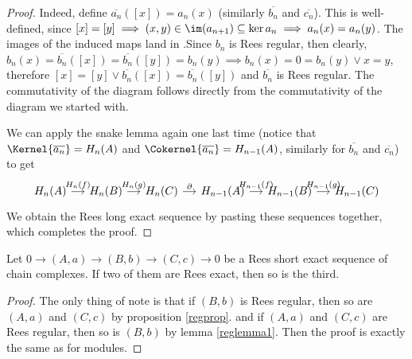 \begin{proof}[Proof]
    Indeed, define $\overline{a_n}([x]) = a_n(x)$ (similarly $\overline{b_n}$ and $\overline{c_n}$). This is well-defined, since
    $[x]=[y] \implies (x,y)\in\im(a_{n+1})\subseteq\ker{a_n} \implies a_n(x)=a_n(y)$. The images of the induced 
    maps land in .Since $b_n$ is Rees regular, then clearly,
    $b_n(x)=\overline{b_n}([x])=\overline{b_n}([y])=b_n(y) \implies b_n(x)=0=b_n(y) \lor x=y$, therefore $[x]=[y] \lor \overline{b_n}([x])=\overline{b_n}([y])$
    and $\overline{b_n}$ is Rees regular. The commutativity of the diagram follows directly from the commutativity of the diagram
    we started with.\par 
    We can apply the snake lemma again one last time (notice that $\Kernel{\overline{a_n}} = H_n(A)$ and $\Cokernel{\overline{a_n}} = H_{n-1}(A)$, similarly
    for $\overline{b_n}$ and $\overline{c_n}$) to get 
    \[\begin{tikzcd}[sep=small]
        {H_{n}(A)} & {H_n(B)} & {H_n(C)} & {H_{n-1}(A)} & {H_{n-1}(B)} & {H_{n-1}(C)}
        \arrow["{H_n(f)}", from=1-1, to=1-2]
        \arrow["{H_n(g)}", from=1-2, to=1-3]
        \arrow["\partial", from=1-3, to=1-4]
        \arrow["{H_{n-1}(f)}", from=1-4, to=1-5]
        \arrow["{H_{n-1}(g)}", from=1-5, to=1-6]
    \end{tikzcd}\]
    We obtain the Rees long exact sequence by pasting these sequences together, which completes the proof.
\end{proof}
\begin{corollary}
    Let $0 \to (A,a) \to (B,b) \to (C,c) \to 0$ be a Rees short exact sequence of chain complexes. If two of them are 
    Rees exact, then so is the third.
\end{corollary}
\begin{proof}[Proof]
    The only thing of note is that if $(B,b)$ is Rees regular, then so are $(A,a)$ and $(C,c)$ by proposition \ref{regprop}. and 
    if $(A,a)$ and $(C,c)$ are Rees regular, then so is $(B,b)$ by lemma \ref{reglemma1}. Then the proof is exactly the same as 
    for modules.
\end{proof}
